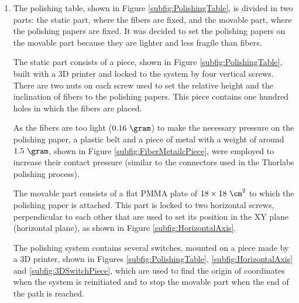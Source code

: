 \begin{enumerate}
\item{} The polishing table, shown in Figure \ref{subfig:PolishingTable}, is divided in two parts: the static part, where the fibers are fixed, and the movable part, where the polishing papers are fixed. It was decided to set the polishing papers on the movable part because they are lighter and less fragile than fibers.

The static part consists of a piece, shown in Figure \ref{subfig:PolishingTable}, built with a 3D printer and locked to the system by four vertical screws. There are two nuts on each screw used to set the relative height and the inclination of fibers to the polishing papers. This piece contains one hundred holes in which the fibers are placed. 

As the fibers are too light ($0.16~\gram$) to make the necessary pressure on the polishing paper, a plastic belt and a piece of metal with a weight of around $1.5~\gram$, shown in Figure \ref{subfig:FiberMetailcPiece}, were employed to increase their contact pressure (similar to the connectors used in the Thorlabs polishing process). 

The movable part consists of a flat PMMA plate of $18 \times 18~\cm^2$ to which the polishing paper is attached. This part is locked to two horizontal screws, perpendicular to each other that are used to set its position in the XY plane (horizontal plane), as shown in Figure \ref{subfig:HorizontalAxis}.

The polishing system contains several switches,  mounted on a piece made by a 3D printer, shown in Figures \ref{subfig:PolishingTable}, \ref{subfig:HorizontalAxis} and \ref{subfig:3DSwitchPiece}, which are used to find the origin of coordinates when the system is reinitiated and to stop the movable part when the end of the path is reached. 


\end{enumerate}
